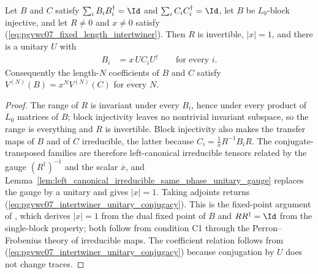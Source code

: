 \begin{lemma}
    \label{lem:pgvwc07_intertwiner_unitary}
    \leanok
    Let $B$ and $C$ satisfy $\sum_iB_iB_i^\dagger=\Id$ and
    $\sum_iC_iC_i^\dagger=\Id$, let $B$ be $L_0$-block injective, and let
    $R\neq0$ and $x\neq0$ satisfy (\ref{eq:pgvwc07_fixed_length_intertwiner}).
    Then $R$ is invertible, $|x|=1$, and there is a unitary $U$ with
    \begin{align}
        B_i & =x\,UC_iU^\dagger \qquad\text{for every }i.
        \label{eq:pgvwc07_intertwiner_unitary_conjugacy}
    \end{align}
    Consequently the length-$N$ coefficients of $B$ and $C$ satisfy
    $V^{(N)}(B)=x^NV^{(N)}(C)$ for every $N$.
\end{lemma}

\begin{proof}
    \leanok
    The range of $R$ is invariant under every $B_i$, hence under every
    product of $L_0$ matrices of $B$; block injectivity leaves no nontrivial
    invariant subspace, so the range is everything and $R$ is invertible.
    Block injectivity also makes the transfer maps of $B$ and of $C$
    irreducible, the latter because $C_i=\tfrac1xR^{-1}B_iR$. The
    conjugate-transposed families are therefore left-canonical irreducible
    tensors related by the gauge $(R^\dagger)^{-1}$ and the scalar
    $\overline{x}$, and
    Lemma~\ref{lem:left_canonical_irreducible_same_phase_unitary_gauge}
    replaces the gauge by a unitary and gives $|x|=1$. Taking adjoints
    returns (\ref{eq:pgvwc07_intertwiner_unitary_conjugacy}). This is the
    fixed-point argument of \cite[Theorem~7]{PerezGarcia2007Matrix}, which
    derives $|x|=1$ from the dual fixed point of $B$ and $RR^\dagger=\Id$
    from the single-block property; both follow from condition C1 through
    the Perron--Frobenius theory of irreducible maps. The coefficient
    relation follows from (\ref{eq:pgvwc07_intertwiner_unitary_conjugacy})
    because conjugation by $U$ does not change traces.
\end{proof}

